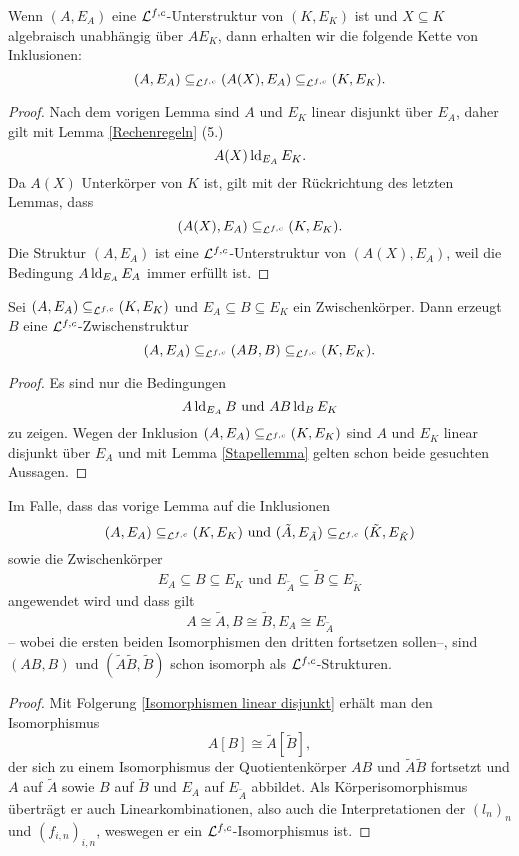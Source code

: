     \begin{lemma}\label{transz Erw}
    	Wenn $(A,E_A)$ eine $\mathcal{L}^{f,c}$-Unterstruktur von $(K,E_K)$ ist und $X\subseteq K$ algebraisch unabhängig über $AE_K$, dann erhalten wir die folgende Kette von Inklusionen: $$(A,E_A)\subseteq_{\mathcal{L}^{f,c}}(A(X),E_A)\subseteq_{\mathcal{L}^{f,c}}(K,E_K).$$
    \end{lemma}
    \begin{proof}
    	Nach dem vorigen Lemma sind $A$ und $E_K$ linear disjunkt über $E_A$, daher gilt mit Lemma \ref{Rechenregeln} (5.) $$A(X)\operatorname{ld}_{E_A}E_K.$$ Da $A(X)$ Unterkörper von $K$ ist, gilt mit der Rückrichtung des letzten Lemmas, dass $$(A(X),E_A)\subseteq_{\mathcal{L}^{f,c}}(K,E_K).$$
    	Die Struktur $(A,E_A)$ ist eine $\mathcal{L}^{f,c}$-Unterstruktur von $(A(X),E_A)$, weil die Bedingung $A\operatorname{ld}_{E_A} E_A$ immer erfüllt ist.
    \end{proof}
    \newpage
    \begin{lemma}\label{E-Erw}
    	Sei $(A,E_A)\subseteq_{\mathcal{L}^{f,c}}(K,E_K)$ und $E_A\subseteq B\subseteq E_K$ ein Zwischenkörper. Dann erzeugt $B$ eine $\mathcal{L}^{f,c}$-Zwischenstruktur $$(A,E_A)\subseteq_{\mathcal{L}^{f,c}}(AB,B)\subseteq_{\mathcal{L}^{f,c}}(K,E_K).$$
    \end{lemma}
    \begin{proof}
    	Es sind nur die Bedingungen $$A\operatorname{ld}_{E_A}B\text{ und }AB\operatorname{ld}_BE_K$$ zu zeigen. Wegen der Inklusion $(A,E_A)\subseteq_{\mathcal{L}^{f,c}}(K,E_K)$ sind $A$ und $E_K$ linear disjunkt über $E_A$ und mit Lemma \ref{Stapellemma} gelten schon beide gesuchten Aussagen.
    \end{proof}
    
    \begin{lemma}\label{Fortsetzungslemma}
    	Im Falle, dass das vorige Lemma auf die Inklusionen $$(A,E_A)\subseteq_{\mathcal{L}^{f,c}}(K,E_K)\text{ und }(\tilde{A},E_{\tilde{A}})\subseteq_{\mathcal{L}^{f,c}}(\tilde{K},E_{\tilde{K}})$$ sowie die Zwischenkörper $$E_A\subseteq B\subseteq E_K\text{ und }E_{\tilde{A}}\subseteq \tilde{B}\subseteq E_{\tilde{K}}$$ angewendet wird und dass gilt $$A\cong \tilde{A},B\cong \tilde{B},E_A\cong E_{\tilde{A}}$$ \--- wobei die ersten beiden Isomorphismen den dritten fortsetzen sollen\---, sind $(AB,B)$ und $(\tilde{A}\tilde{B},\tilde{B})$ schon isomorph als $\mathcal{L}^{f,c}$-Strukturen.
    \end{lemma}
    \begin{proof}
    	Mit Folgerung \ref{Isomorphismen linear disjunkt} erhält man den Isomorphismus $$A[B]\cong\tilde{A}[\tilde{B}],$$ der sich zu einem Isomorphismus der Quotientenkörper $AB$ und $\tilde{A}\tilde{B}$ fortsetzt und $A$ auf $\tilde{A}$ sowie $B$ auf $\tilde{B}$ und $E_A$ auf $E_{\tilde{A}}$ abbildet. Als Körperisomorphismus überträgt er auch Linearkombinationen, also auch die Interpretationen der $(l_n)_n$ und $(f_{i,n})_{i,n}$, weswegen er ein $\mathcal{L}^{f,c}$-Isomorphismus ist.
    \end{proof}
    
